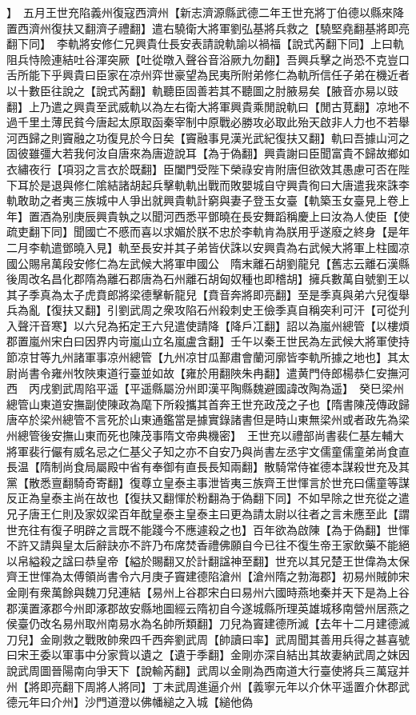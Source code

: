 】　五月王世充陷義州復寇西濟州【新志濟源縣武德二年王世充將丁伯德以縣來降置西濟州復扶又翻濟子禮翻】遣右驍衛大將軍劉弘基將兵救之【驍堅堯翻基將即亮翻下同】　李軌將安修仁兄興貴仕長安表請說軌諭以禍福【說式芮翻下同】上曰軌阻兵恃險連結吐谷渾突厥【吐從暾入聲谷音浴厥九勿翻】吾興兵擊之尚恐不克豈口舌所能下乎興貴曰臣家在凉州弈世豪望為民夷所附弟修仁為軌所信任子弟在機近者以十數臣往說之【說式芮翻】軌聽臣固善若其不聽圖之肘腋易矣【腋音亦易以豉翻】上乃遣之興貴至武威軌以為左右衛大將軍興貴乘閒說軌曰【閒古莧翻】凉地不過千里土薄民貧今唐起太原取函秦宰制中原戰必勝攻必取此殆天啟非人力也不若舉河西歸之則竇融之功復見於今日矣【竇融事見漢光武紀復扶又翻】軌曰吾據山河之固彼雖彊大若我何汝自唐來為唐遊說耳【為于偽翻】興貴謝曰臣聞富貴不歸故鄉如衣繡夜行【項羽之言衣於既翻】臣闔門受陛下榮祿安肯附唐但欲效其愚慮可否在陛下耳於是退與修仁隂結諸胡起兵擊軌軌出戰而敗嬰城自守興貴徇曰大唐遣我來誅李軌敢助之者夷三族城中人爭出就興貴軌計窮與妻子登玉女臺【軌築玉女臺見上卷上年】置酒為别庚辰興貴執之以聞河西悉平鄧曉在長安舞蹈稱慶上曰汝為人使臣【使疏吏翻下同】聞國亡不慼而喜以求媚於朕不忠於李軌肯為朕用乎遂廢之終身【是年二月李軌遣鄧曉入見】軌至長安并其子弟皆伏誅以安興貴為右武候大將軍上柱國凉國公賜帛萬段安修仁為左武候大將軍申國公　隋末離石胡劉龍兒【舊志云離石漢縣後周改名昌化郡隋為離石郡唐為石州離石胡匈奴種也即稽胡】擁兵數萬自號劉王以其子季真為太子虎賁郎將梁德擊斬龍兒【賁音奔將即亮翻】至是季真與弟六兒復舉兵為亂【復扶又翻】引劉武周之衆攻陷石州殺刺史王儉季真自稱突利可汗【可從刋入聲汗音寒】以六兒為拓定王六兒遣使請降【降戶冮翻】詔以為嵐州總管【以樓煩郡置嵐州宋白曰因界内岢嵐山立名嵐盧含翻】壬午以秦王世民為左武候大將軍使持節凉甘等九州諸軍事凉州總管【九州凉甘瓜鄯肅會蘭河廓皆李軌所據之地也】其太尉尚書令雍州牧陜東道行臺並如故【雍於用翻陜朱冉翻】遣黄門侍郎楊恭仁安撫河西　丙戌劉武周陷平遥【平遥縣屬汾州即漢平陶縣魏避國諱改陶為遥】　癸巳梁州總管山東道安撫副使陳政為麾下所殺攜其首奔王世充政茂之子也【隋書陳茂傳政歸唐卒於梁州總管不言死於山東通鑑當是據實錄諸書但是時山東無梁州或者政先為梁州總管後安撫山東而死也陳茂事隋文帝典機密】　王世充以禮部尚書裴仁基左輔大將軍裴行儼有威名忌之仁基父子知之亦不自安乃與尚書左丞宇文儒童儒童弟尚食直長温【隋制尚食局屬殿中省有奉御有直長長知兩翻】散騎常侍崔德本謀殺世充及其黨【散悉亶翻騎奇寄翻】復尊立皇泰主事泄皆夷三族齊王世惲言於世充曰儒童等謀反正為皇泰主尚在故也【復扶又翻惲於粉翻為于偽翻下同】不如早除之世充從之遣兄子唐王仁則及家奴梁百年酖皇泰主皇泰主曰更為請太尉以往者之言未應至此【謂世充往有復子明辟之言既不能踐今不應遽殺之也】百年欲為啟陳【為于偽翻】世惲不許又請與皇太后辭訣亦不許乃布席焚香禮佛願自今已往不復生帝王家飲藥不能絕以帛縊殺之諡曰恭皇帝【縊於賜翻又於計翻諡神至翻】世充以其兄楚王世偉為太保齊王世惲為太傅領尚書令六月庚子竇建德陷滄州【滄州隋之勃海郡】初易州賊帥宋金剛有衆萬餘與魏刀兒連結【易州上谷郡宋白曰易州六國時燕地秦并天下是為上谷郡漢置涿郡今州即涿郡故安縣地圖經云隋初自今遂城縣所理英雄城移南營州居燕之侯臺仍改名易州取州南易水為名帥所類翻】刀兒為竇建德所滅【去年十二月建德滅刀兒】金剛救之戰敗帥衆四千西奔劉武周【帥讀曰率】武周聞其善用兵得之甚喜號曰宋王委以軍事中分家貲以遺之【遺于季翻】金剛亦深自結出其故妻納武周之妺因說武周圖晉陽南向爭天下【說輸芮翻】武周以金剛為西南道大行臺使將兵三萬寇并州【將即亮翻下周將人將同】丁未武周進逼介州【義寧元年以介休平遥置介休郡武德元年曰介州】沙門道澄以佛幡縋之入城【縋他偽